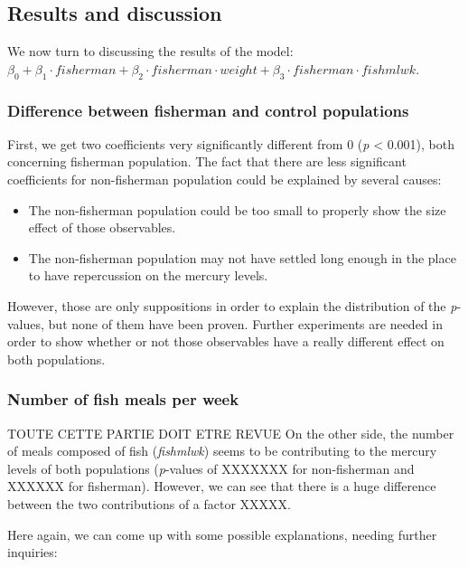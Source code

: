 \documentclass[12pt,]{article}
\providecommand{\tightlist}{%
  \setlength{\itemsep}{0pt}\setlength{\parskip}{0pt}}
\begin{document}
\subsection{Results and discussion}\label{results-and-discussion}

We now turn to discussing the results of the model:
\(\beta_0 + \beta_1 \cdot fisherman + \beta_2 \cdot fisherman \cdot weight + \beta_3 \cdot fisherman \cdot fishmlwk\).

\subsubsection{Difference between fisherman and control
populations}\label{difference-between-fisherman-and-control-populations}

First, we get two coefficients very significantly different from 0
(\emph{p} \textless{} 0.001), both concerning fisherman population. The
fact that there are less significant coefficients for non-fisherman
population could be explained by several causes:

\begin{itemize}
\tightlist
\item
  The non-fisherman population could be too small to properly show the
  size effect of those observables.
\item
  The non-fisherman population may not have settled long enough in the
  place to have repercussion on the mercury levels.
\end{itemize}

However, those are only suppositions in order to explain the
distribution of the \emph{p}-values, but none of them have been proven.
Further experiments are needed in order to show whether or not those
observables have a really different effect on both populations.

\subsubsection{Number of fish meals per
week}\label{number-of-fish-meals-per-week}

TOUTE CETTE PARTIE DOIT ETRE REVUE On the other side, the number of
meals composed of fish (\emph{fishmlwk}) seems to be contributing to the
mercury levels of both populations (\emph{p}-values of XXXXXXX for
non-fisherman and XXXXXX for fisherman). However, we can see that there
is a huge difference between the two contributions of a factor XXXXX.

Here again, we can come up with some possible explanations, needing
further inquiries:
\end{document}
